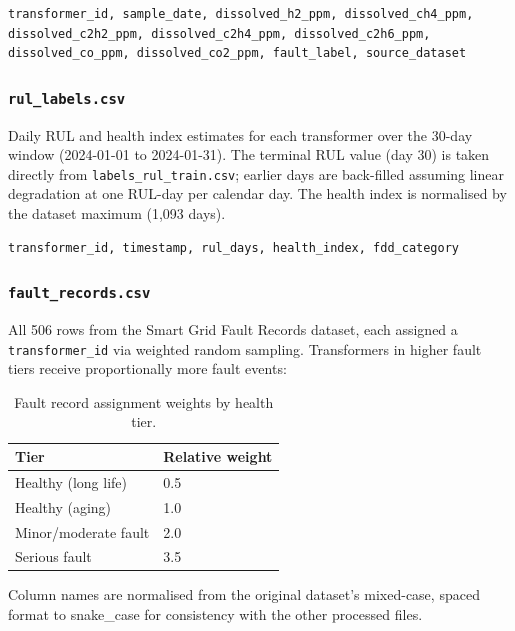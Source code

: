 \begin{verbatim}
transformer_id, sample_date, dissolved_h2_ppm, dissolved_ch4_ppm,
dissolved_c2h2_ppm, dissolved_c2h4_ppm, dissolved_c2h6_ppm,
dissolved_co_ppm, dissolved_co2_ppm, fault_label, source_dataset
\end{verbatim}

\subsubsection{\texttt{rul\_labels.csv}}

Daily RUL and health index estimates for each transformer over the 30-day
window (2024-01-01 to 2024-01-31).  The terminal RUL value (day 30) is taken
directly from \texttt{labels\_rul\_train.csv}; earlier days are back-filled
assuming linear degradation at one RUL-day per calendar day.  The health index
is normalised by the dataset maximum (1{,}093 days).

\begin{verbatim}
transformer_id, timestamp, rul_days, health_index, fdd_category
\end{verbatim}

\subsubsection{\texttt{fault\_records.csv}}

All 506 rows from the Smart Grid Fault Records dataset, each assigned a
\texttt{transformer\_id} via weighted random sampling.  Transformers in higher
fault tiers receive proportionally more fault events:

\begin{table}[h]
\centering
\caption{Fault record assignment weights by health tier.}
\label{tab:weights}
\begin{tabular}{ll}
\hline
\textbf{Tier} & \textbf{Relative weight} \\
\hline
Healthy (long life)  & 0.5 \\
Healthy (aging)      & 1.0 \\
Minor/moderate fault & 2.0 \\
Serious fault        & 3.5 \\
\hline
\end{tabular}
\end{table}

Column names are normalised from the original dataset's mixed-case, spaced
format to snake\_case for consistency with the other processed files.

